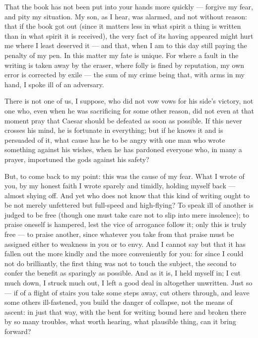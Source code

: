 

 That the book has not been put into your hands more quickly --- forgive my fear, and pity my situation. My son, as I hear, was alarmed, and not without reason: that if the book got out (since it matters less in what spirit a thing is written than in what spirit it is received), the very fact of its having appeared might hurt me where I least deserved it --- and that, when I am to this day still paying the penalty of my pen. In this matter my fate is unique. For where a fault in the writing is taken away by the eraser, where folly is fined by reputation, my own error is corrected by exile --- the sum of my crime being that, with arms in my hand, I spoke ill of an adversary.

 There is not one of us, I suppose, who did not vow vows for his side's victory, not one who, even when he was sacrificing for some other reason, did not even at that moment pray that Caesar should be defeated as soon as possible. If this never crosses his mind, he is fortunate in everything; but if he knows it and is persuaded of it, what cause has he to be angry with one man who wrote something against his wishes, when he has pardoned everyone who, in many a prayer, importuned the gods against his safety?

 But, to come back to my point: this was the cause of my fear. What I wrote of you, by my honest faith I wrote sparely and timidly, holding myself back --- almost shying off. And yet who does not know that this kind of writing ought to be not merely unfettered but full-speed and high-flying? To speak ill of another is judged to be free (though one must take care not to slip into mere insolence); to praise oneself is hampered, lest the vice of arrogance follow it; only this is truly free --- to praise another, since whatever you take from that praise must be assigned either to weakness in you or to envy. And I cannot say but that it has fallen out the more kindly and the more conveniently for you: for since I could not do brilliantly, the first thing was not to touch the subject, the second to confer the benefit as sparingly as possible. And as it is, I held myself in; I cut much down, I struck much out, I left a good deal in altogether unwritten. Just so --- if of a flight of stairs you take some steps away, cut others through, and leave some others ill-fastened, you build the danger of collapse, not the means of ascent: in just that way, with the bent for writing bound here and broken there by so many troubles, what worth hearing, what plausible thing, can it bring forward?

